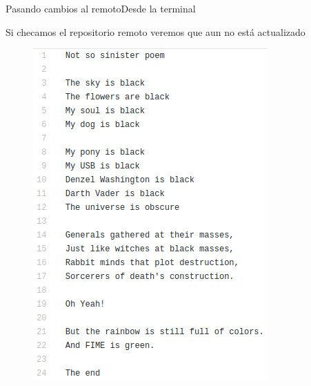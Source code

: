 \documentclass[10pt]{beamer}
\begin{document}
\begin{frame}{Pasando cambios al remoto}{Desde la terminal}

  \begin{block}{Si checamos el repositorio remoto veremos que aun no está actualizado}
  
  \begin{figure}[h!]
  \centering
  \includegraphics [scale=0.28]{step11_2}
  \label{fig:step11_2}
  \end{figure}
      
  \end{block}
  
\end{frame}
\end{document}
